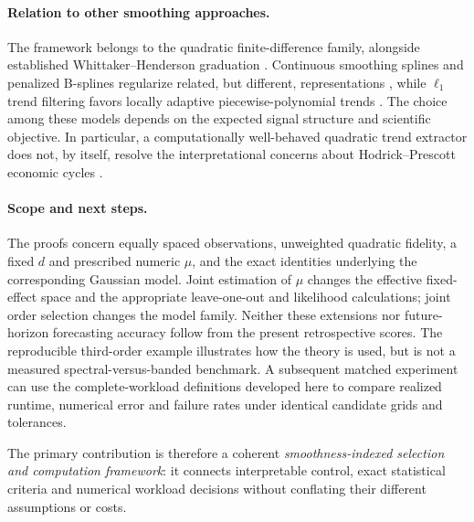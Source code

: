 \paragraph{Relation to other smoothing approaches.}
The framework belongs to the quadratic
finite-difference family, alongside established
Whittaker--Henderson graduation
\citep{weinert2007,biessy2026}.
Continuous smoothing splines and penalized B-splines
regularize related, but different, representations
\citep{reinsch1967,eilersmarx1996}, while
$\ell_1$ trend filtering favors locally adaptive
piecewise-polynomial trends
\citep{kim2009,tibshirani2014}.
The choice among these models depends on the expected
signal structure and scientific objective.
In particular, a computationally well-behaved
quadratic trend extractor does not, by itself, resolve
the interpretational concerns about
Hodrick--Prescott economic cycles
\citep{hamilton2018}.

\paragraph{Scope and next steps.}
The proofs concern equally spaced observations,
unweighted quadratic fidelity, a fixed $d$ and
prescribed numeric $\mu$, and the exact identities
underlying the corresponding Gaussian model.
Joint estimation of $\mu$ changes the effective
fixed-effect space and the appropriate
leave-one-out and likelihood calculations;
joint order selection changes the model
family.  Neither these extensions nor
future-horizon forecasting accuracy follow
from the present retrospective scores.
The reproducible third-order example illustrates
how the theory is used, but is not a measured
spectral-versus-banded benchmark.  A subsequent
matched experiment can use the complete-workload
definitions developed here to compare realized
runtime, numerical error and failure rates
under identical candidate grids and tolerances.

The primary contribution is therefore a coherent
\emph{smoothness-indexed selection and computation
framework}: it connects interpretable control,
exact statistical criteria and numerical
workload decisions without conflating their
different assumptions or costs.
